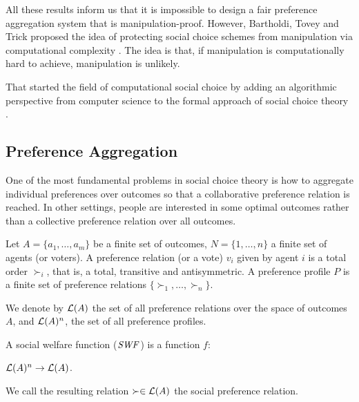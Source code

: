 All these results inform us that it is impossible to design a fair preference
aggregation system that is manipulation-proof.
However, Bartholdi, Tovey and Trick proposed the idea of protecting
social choice schemes from manipulation via computational
complexity \cite{bartholdi:j:whowon,bartholdi:j:compdiff,
bartholdi:j:howhard}.
The idea is that, if manipulation is computationally hard to
achieve, manipulation is unlikely.

That started the field of computational social choice by adding an algorithmic
perspective from computer science to the formal approach 
of social choice theory \cite{Brandt:COMSOC}.




\subsection{Preference Aggregation}
One of the most fundamental problems in social choice theory is how to
aggregate individual preferences over outcomes so that a
collaborative preference relation is reached.
In other settings, people are interested in some optimal outcomes
rather than a collective preference relation over all outcomes.

\begin{definition}
	Let $A=\{a_1,\ldots,a_m\}$ be a finite set of outcomes,
	$N=\{1,\ldots,n\}$ a finite set of agents (or voters).
	A preference relation (or a vote) $v_i$ given by agent $i$ 
	is a total order $\succ_i$,
	that is, a total, transitive and antisymmetric.
	A preference profile $P$ is a finite set of preference relations
	$\{\succ_1, \ldots, \succ_n\}$.
\end{definition}

We denote by $\mathcal{L}(A)$ the set of all preference relations over
the space of outcomes $A$, and $\mathcal{L}(A)^n$, the set of all
preference profiles.

\begin{definition}
	A social welfare function ($\it{SWF}$) is a function $f$:
	\begin{center}
		$\mathcal{L}(A)^n \rightarrow \mathcal{L}(A)$.
	\end{center}
	We call the resulting relation $\succ \in \mathcal{L}(A)$ the social preference relation.
\end{definition}

